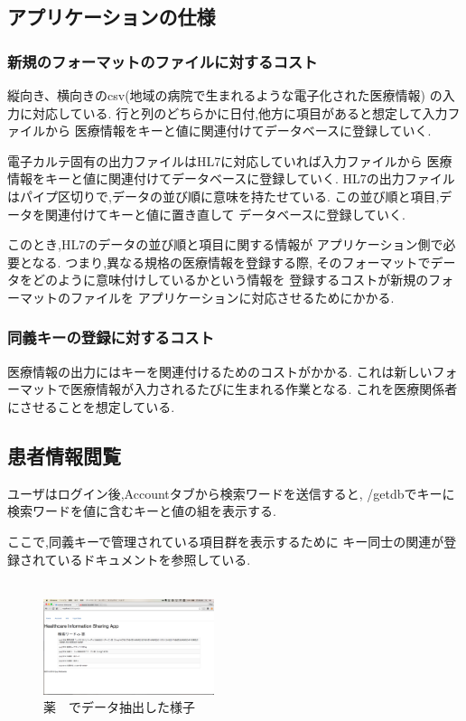 \subsection{アプリケーションの仕様}

	\subsubsection{新規のフォーマットのファイルに対するコスト}
	縦向き、横向きのcsv(地域の病院で生まれるような電子化された医療情報)
	の入力に対応している.
	行と列のどちらかに日付,他方に項目があると想定して入力ファイルから
	医療情報をキーと値に関連付けてデータベースに登録していく.

	電子カルテ固有の出力ファイルはHL7に対応していれば入力ファイルから
	医療情報をキーと値に関連付けてデータベースに登録していく.
	HL7の出力ファイルはパイプ区切りで,データの並び順に意味を持たせている.
	この並び順と項目,データを関連付けてキーと値に置き直して
	データベースに登録していく.

	このとき,HL7のデータの並び順と項目に関する情報が
	アプリケーション側で必要となる.
	つまり,異なる規格の医療情報を登録する際,
	そのフォーマットでデータをどのように意味付けしているかという情報を
	登録するコストが新規のフォーマットのファイルを
	アプリケーションに対応させるためにかかる.


	\subsubsection{同義キーの登録に対するコスト}
	医療情報の出力にはキーを関連付けるためのコストがかかる.
	これは新しいフォーマットで医療情報が入力されるたびに生まれる作業となる.
	これを医療関係者にさせることを想定している.


\subsection{患者情報閲覧}
	ユーザはログイン後,Accountタブから検索ワードを送信すると,
	/getdbでキーに検索ワードを値に含むキーと値の組を表示する.

	ここで,同義キーで管理されている項目群を表示するために
	キー同士の関連が登録されているドキュメントを参照している.
	\\
	\\



		\begin{figure}[htbp]
				\includegraphics[width=5cm, bb=0 0 437 688]{./gazou/getdb.png}
			\caption{薬　でデータ抽出した様子}
			\label{getdb}
		\end{figure}



